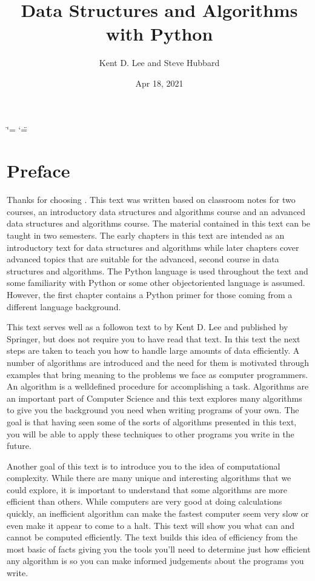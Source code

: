 \documentclass[letterpaper,10pt,english]{sphinxmanual}
\title{Data Structures and Algorithms with Python}
\date{Apr 18, 2021}
\author{Kent D. Lee and Steve Hubbard}
\begin{document}
\ifdefined\shorthandoff
  \ifnum\catcode`\=\string=\active\shorthandoff{=}\fi
  \ifnum\catcode`\"=\active{}\fi
\fi

\pagestyle{empty}
\sphinxmaketitle
\pagestyle{plain}
\sphinxtableofcontents
\pagestyle{normal}
\label{\detokenize{index::doc}}
\chapter*{Preface}

Thanks for choosing . This text was written based on classroom notes for two courses, an introductory data structures and algorithms course and an advanced data structures and algorithms course. The material contained in this text can be taught in two semesters. The early chapters in this text are intended as an introductory text for data structures and algorithms while later chapters cover advanced topics that are suitable for the advanced, second course in data structures and algorithms. The Python language is used throughout the text and some familiarity with Python or some other object\sphinxhyphen{}oriented language is assumed. However, the first chapter contains a Python primer for those coming from a different language background.

This text serves well as a follow\sphinxhyphen{}on text to  by Kent D. Lee and published by Springer, but does not require you to have read that text. In this text the next steps are taken to teach you how to handle large amounts of data efficiently. A number of algorithms are introduced and the need for them is motivated through examples that bring meaning to the problems we face as computer programmers. An algorithm is a well\sphinxhyphen{}defined procedure for accomplishing a task. Algorithms are an important part of Computer Science and this text explores many algorithms to give you the background you need when writing programs of your own. The goal is that having seen some of the sorts of algorithms presented in this text, you will be able to apply these techniques to other programs you write in the future.

Another goal of this text is to introduce you to the idea of computational complexity. While there are many unique and interesting algorithms that we could explore, it is important to understand that some algorithms are more efficient than others. While computers are very good at doing calculations quickly, an inefficient algorithm can make the fastest computer seem very slow or even make it appear to come to a halt. This text will show you what can and cannot be computed efficiently. The text builds this idea of efficiency from the most basic of facts giving you the tools you’ll need to determine just how efficient any algorithm is so you can make informed judgements about the programs you write.
\end{document}
